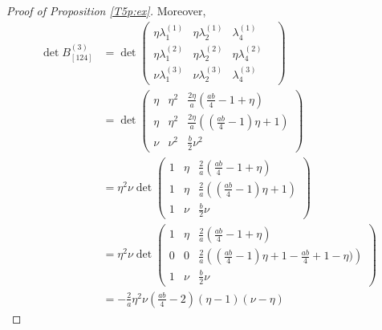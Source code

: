 \documentclass[10pt,a4paper]{amsart}
\begin{document}
\begin{proof}[Proof of Proposition \ref{T5p:ex}]
 
 Moreover, 
 \begin{align*}
\det B^{(3)}_{[124]} &=
%
\det  \begin{pmatrix} \eta \lambda^{(1)}_1  & \eta   \lambda^{(1)}_2 &   \lambda^{(1)}_4 &  \\
\eta  \lambda^{(2)}_1 & \eta \lambda^{(2)}_2 &   \eta  \lambda^{(2)}_4 &  \\
 \nu   \lambda^{(3)}_1 & \nu \lambda^{(3)}_2 &   \lambda^{(3)}_4 
\end{pmatrix}
  \\
%
&= 
\det\begin{pmatrix}
	\eta &\eta^2&\tfrac{2\eta}{a}\left(\tfrac{ab}{4}-1+\eta\right)\\
    \eta &\eta^2&\tfrac{2\eta}{a}\left((\tfrac{ab}{4}-1)\eta+1\right)\\
    \nu &\nu^2&   \tfrac{b}{2}\nu^2
\end{pmatrix}  \\
%
&= \eta^2 \nu
 \det\begin{pmatrix} 
	1 &\eta&\tfrac{2}{a}\left(\tfrac{ab}{4}-1+\eta\right)\\
    1 &\eta&\tfrac{2}{a}\left((\tfrac{ab}{4}-1)\eta+1\right)\\
    1 &\nu&  \tfrac{b}{2}\nu
\end{pmatrix}
\\
&=
\eta^2 \nu
 \det\begin{pmatrix} 
	1 &\eta&\tfrac{2}{a}\left(\tfrac{ab}{4}-1+\eta\right)\\
    0 & 0 &\tfrac{2}{a}     \left((\tfrac{ab}{4}-1)\eta+1     - \tfrac{ab}{4} + 1 - \eta) \right)\\
    1 &\nu&  \tfrac{b}{2}\nu
\end{pmatrix}
\\
&=-\frac{2}{a}\eta^2\nu(\tfrac{ab}{4}-2)(\eta-1)(\nu-\eta)
\end{align*}


\end{proof}
\end{document}
